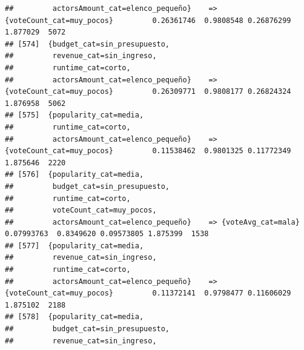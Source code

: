 \documentclass[
]{article}
\begin{document}
\begin{verbatim}
##         actorsAmount_cat=elenco_pequeño}    => {voteCount_cat=muy_pocos}         0.26361746  0.9808548 0.26876299 1.877029  5072
## [574]  {budget_cat=sin_presupuesto,                                                                                             
##         revenue_cat=sin_ingreso,                                                                                                
##         runtime_cat=corto,                                                                                                      
##         actorsAmount_cat=elenco_pequeño}    => {voteCount_cat=muy_pocos}         0.26309771  0.9808177 0.26824324 1.876958  5062
## [575]  {popularity_cat=media,                                                                                                   
##         runtime_cat=corto,                                                                                                      
##         actorsAmount_cat=elenco_pequeño}    => {voteCount_cat=muy_pocos}         0.11538462  0.9801325 0.11772349 1.875646  2220
## [576]  {popularity_cat=media,                                                                                                   
##         budget_cat=sin_presupuesto,                                                                                             
##         runtime_cat=corto,                                                                                                      
##         voteCount_cat=muy_pocos,                                                                                                
##         actorsAmount_cat=elenco_pequeño}    => {voteAvg_cat=mala}                0.07993763  0.8349620 0.09573805 1.875399  1538
## [577]  {popularity_cat=media,                                                                                                   
##         revenue_cat=sin_ingreso,                                                                                                
##         runtime_cat=corto,                                                                                                      
##         actorsAmount_cat=elenco_pequeño}    => {voteCount_cat=muy_pocos}         0.11372141  0.9798477 0.11606029 1.875102  2188
## [578]  {popularity_cat=media,                                                                                                   
##         budget_cat=sin_presupuesto,                                                                                             
##         revenue_cat=sin_ingreso,                                                                                                

\end{verbatim}
\end{document}
